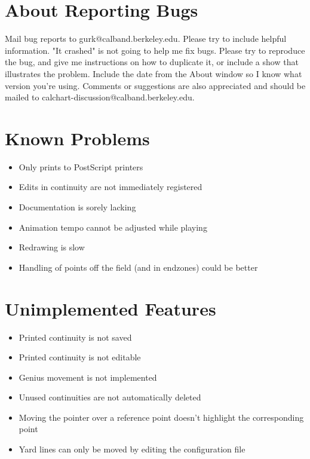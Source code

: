 \section{About Reporting Bugs}\label{reportingbugs}

Mail bug reports to gurk@calband.berkeley.edu.  Please try to include
helpful information.  "It crashed" is not going to help me fix bugs.
Please try to reproduce the bug, and give me instructions on how to
duplicate it, or include a show that illustrates the problem.  Include
the date from the About window so I know what version you're using.  Comments
or suggestions are also appreciated and should be mailed to
calchart-discussion@calband.berkeley.edu.

\section{Known Problems}\label{problems}

\begin{itemize}\itemsep=0pt
\item Only prints to PostScript printers
\item Edits in continuity are not immediately registered
\item Documentation is sorely lacking
\item Animation tempo cannot be adjusted while playing
\item Redrawing is slow
\item Handling of points off the field (and in endzones) could be better
\end{itemize}

\section{Unimplemented Features}\label{notdone}

\begin{itemize}\itemsep=0pt
\item Printed continuity is not saved
\item Printed continuity is not editable
\item Genius movement is not implemented
\item Unused continuities are not automatically deleted
\item Moving the pointer over a reference point doesn't highlight the
corresponding point
\item Yard lines can only be moved by editing the configuration file
\end{itemize}
